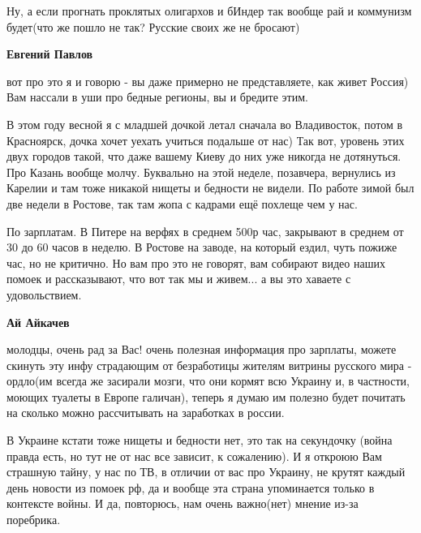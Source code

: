 \begin{itemize}
\begin{itemize}
Ну, а если прогнать проклятых олигархов и бИндер так вообще рай и коммунизм
будет(что же пошло не так?  Русские своих же не бросают)

 

\textbf{Евгений Павлов} 

вот про это я и говорю - вы даже примерно не представляете, как живет Россия)
Вам нассали в уши про бедные регионы, вы и бредите этим. 

В этом году весной я с младшей дочкой летал сначала во Владивосток, потом в
Красноярск, дочка хочет уехать учиться подальше от нас) Так вот, уровень этих
двух городов такой, что даже вашему Киеву до них уже никогда не дотянуться. Про
Казань вообще молчу. Буквально на этой неделе, позавчера, вернулись из Карелии
и там тоже никакой нищеты и бедности не видели. По работе зимой был две недели
в Ростове, так там жопа с кадрами ещё похлеще чем у нас. 

По зарплатам. В Питере на верфях в среднем 500р час, закрывают в среднем от 30
до 60 часов в неделю. В Ростове на заводе, на который ездил, чуть пожиже час,
но не критично. Но вам про это не говорят, вам собирают видео наших помоек и
рассказывают, что вот так мы и живем... а вы это хаваете с удовольствием.

 
\textbf{Ай Айкачев} 

молодцы, очень рад за Вас! очень полезная информация про зарплаты, можете
скинуть эту инфу страдающим от безработицы жителям витрины русского мира -
ордло(им всегда же засирали мозги, что они кормят всю Украину и, в частности,
моющих туалеты в Европе галичан), теперь я думаю им полезно будет почитать на
сколько можно рассчитывать на заработках в россии. 

В Украине кстати тоже нищеты и бедности нет, это так на секундочку (война
правда есть, но тут не от нас все зависит, к сожалению). И я откроюю Вам
страшную тайну, у нас по ТВ, в отличии от вас про Украину, не крутят каждый
день новости из помоек рф, да и вообще эта страна упоминается только в
контексте войны. И да, повторюсь, нам очень важно(нет) мнение из-за поребрика.



\end{itemize}
\end{itemize}
